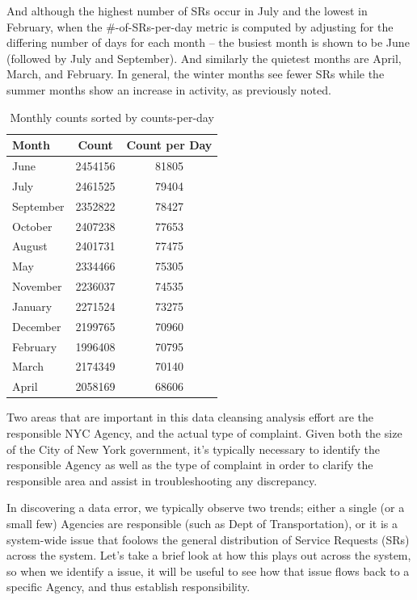 \documentclass[12pt, titlepage]{article}
\begin{document}
And although the highest number of SRs occur in July and the lowest in February,
when the \#-of-SRs-per-day metric is computed by adjusting for the differing number of days for each month -- the
busiest month is shown to be June (followed by July and September). And similarly the quietest months are April, March, and 
February. In general, the winter months see fewer SRs while the summer months show 
an increase in activity, as previously noted.

\begin{table}[ht]
    \centering
    \begin{tabular}{lS[table-format=7.0]S[table-format=6.0]} %
        \toprule
        \textbf{Month}     & \textbf{Count}   & \textbf{Count per Day} \\ 
        \midrule
        June  & 2454156 & 81805 \\ 
        July  & 2461525 & 79404 \\ 
        September & 2352822 & 78427 \\ 
        October & 2407238 & 77653 \\ 
        August & 2401731 & 77475 \\ 
        May  & 2334466 & 75305 \\ 
        November  & 2236037 & 74535 \\ 
        January   & 2271524 & 73275 \\ 
        December  & 2199765 & 70960 \\ 
        February  & 1996408 & 70795 \\ 
        March & 2174349 & 70140 \\ 
        April  & 2058169 & 68606 \\ 
       \bottomrule
    \end{tabular}
    \caption{Monthly counts sorted by counts-per-day}
    \label{tab:monthly_counts}
\end{table}

\FloatBarrier %

Two  areas that are important in this data cleansing analysis effort are the responsible NYC Agency, and the actual type of complaint.
Given both the size of the City of New York government, it's typically necessary to identify the responsible Agency as well as the type of complaint in order to 
clarify the responsible area and assist in troubleshooting any discrepancy.

In discovering a data error, we typically observe two trends; either a single (or a small few) Agencies are responsible (such as Dept of Transportation), or it is a system-wide issue that foolows the general distribution
of  Service Requests (SRs) across the system. Let's take a brief look at how this plays out across the system, so when we identify a
issue, it will be useful to see how that issue flows back to a specific Agency, and thus establish responsibility.
\end{document}

